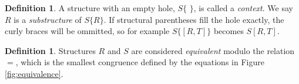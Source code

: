 \documentclass[12pt, oneside]{article}
\theoremstyle{plain}
\theoremstyle{definition}
\newtheorem{definition}[theorem]{Definition}
\begin{document}
\begin{definition}
A structure with an empty hole, $S\{\,\,\}$, is called a \textit{context}.
We say $R$ is a \textit{substructure} of $S\{R\}$.
If structural parentheses fill the hole exactly, the curly braces will be ommitted, so for example $S\{[R,T]\}$ becomes $S[R,T]$.
\end{definition}

\begin{definition}
Structures $R$ and $S$ are considered \textit{equivalent} modulo the relation $=$, which is the smallest congruence defined by the equations in Figure \ref{fig:equivalence}.
\end{definition}

\begin{figure}[ht!]
    \centering
    \setlength{\fboxsep}{5pt} %
    \setlength{\fboxrule}{0.5pt} %
\end{figure}
\end{document}
